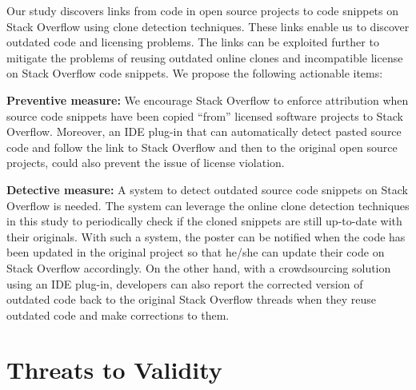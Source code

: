 \documentclass[sigconf,review, anonymous]{acmart}
\begin{document}
Our study discovers links from code in open source projects to code
snippets on Stack Overflow using clone detection techniques. These
links enable us to discover outdated code and licensing problems. The
links can be exploited further to mitigate the problems of reusing
outdated online clones and incompatible license on Stack Overflow code
snippets. We propose the following actionable items:

\textbf{Preventive measure:} We encourage Stack Overflow to enforce attribution when source code snippets have been copied ``from'' licensed software projects to Stack Overflow. Moreover, an IDE plug-in that can automatically detect pasted source code and follow the link to Stack Overflow and then to the original open source projects, could also prevent the issue of license violation.

\textbf{Detective measure:} A system to detect outdated source code
snippets on Stack Overflow is needed. The system can leverage the
online clone detection techniques in this study to periodically check
if the cloned snippets are still up-to-date with their
originals. %
With such a system, the poster can be notified when the code has been
updated in the original project so that he/she can update their code
on Stack Overflow accordingly. On the other hand, with a crowdsourcing
solution using an IDE plug-in, developers can also report the
corrected version of outdated code back to the original Stack Overflow
threads when they reuse outdated code and make corrections to them.

\section{Threats to Validity}
\end{document}
